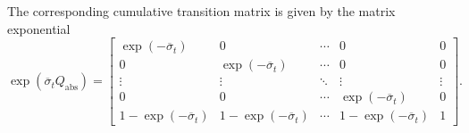         The corresponding cumulative transition matrix is given by the matrix exponential
        \begin{equation}
            \exp(\overline{\sigma}_t Q_{\text{abs}}) =
            \begin{bmatrix}
                \exp(-\overline{\sigma}_t) & 0 & \cdots & 0 & 0 \\
                0 & \exp(-\overline{\sigma}_t) & \cdots & 0 & 0 \\
                \vdots & \vdots & \ddots & \vdots & \vdots \\
                0 & 0 & \cdots & \exp(-\overline{\sigma}_t) & 0 \\
                1 - \exp(-\overline{\sigma}_t) & 1 - \exp(-\overline{\sigma}_t) & \cdots & 1 - \exp(-\overline{\sigma}_t) & 1
            \end{bmatrix}.
        \end{equation}
        
